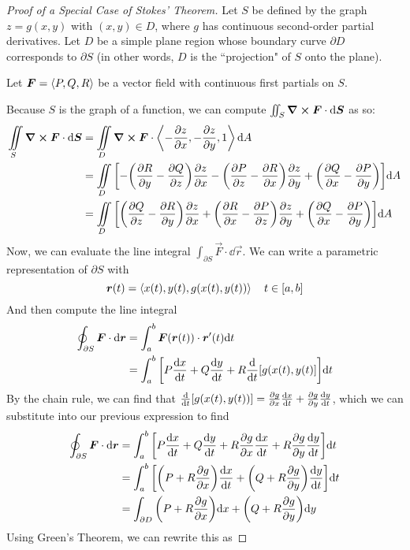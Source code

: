 \begin{proof}[Proof of a Special Case of Stokes' Theorem]
    Let $S$ be defined by the graph $z = g(x,y)$ with $(x,y)\in D$, where $g$ has continuous second-order partial derivatives. Let $D$ be a simple plane region whose boundary curve $\partial D$ corresponds to $\partial S$ (in other words, $D$ is the ``projection" of $S$ onto the plane). \par
    Let $\boldsymbol{F} = \left\langle P, Q, R\right\rangle$ be a vector field with continuous first partials on $S$. \par
    Because $S$ is the graph of a function, we can compute $\iint_S \curl \boldsymbol{F} \cdot \dd \boldsymbol{S}$ as so:
    \begin{align*}
        \iint\limits_S \curl\vec F \cdot \dd \vec S 
        &=\iint\limits_D \curl \vec F \cdot \<-\pdv{z}{x}, -\pdv{z}{y}, 1 \>\dd A \\
        &= \iint\limits_D \bqty{-\pqty{\pdv{R}{y}-\pdv{Q}{z}}\pdv{z}{x}-\pqty{\pdv{P}{z}-\pdv{R}{x}}\pdv{z}{y}+\pqty{\pdv{Q}{x}-\pdv{P}{y}}}\dd A \\
        &= \iint\limits_D \bqty{\pqty{\pdv{Q}{z}-\pdv{R}{y}}\pdv{z}{x}+\pqty{\pdv{R}{x}-\pdv{P}{z}}\pdv{z}{y}+\pqty{\pdv{Q}{x}-\pdv{P}{y}}}\dd A
    \end{align*}
    Now, we can evaluate the line integral $\int_{\partial S}\vec F \cdot \dd \vec r$. We can write a parametric representation of $\partial S$ with
    \[ \boldsymbol{r}(t) = \left\langle x(t), y(t), g(x(t), y(t))\right\rangle \quad t\in[a,b]\]
    And then compute the line integral
    \begin{align*}
        \oint_{\partial S} \vec F \cdot \dd \vec r &= \int_a^b \vec F(\vec r(t)) \cdot \vec r'(t)\dd t \\
        &= \int_a^b \bqty{P\dv{x}{t} + Q\dv{y}{t} + R\dv{t}[g(x(t),y(t)]}\dd t
    \end{align*}
    By the chain rule, we can find that $\dv{t}[g(x(t),y(t))] = \pdv{g}{x}\dv{x}{t} + \pdv{g}{y}\dv{y}{t}$,
    which we can substitute into our previous expression to find
    \begin{align*}
        \oint_{\partial S} \vec F \cdot \dd \vec r &= \int_a^b \bqty{P\dv{x}{t} + Q\dv{y}{t} + R\pdv{g}{x}\dv{x}{t} + R\pdv{g}{y}\dv{y}{t}}\dd t \\
        &= \int_a^b \bqty{\pqty{P + R\pdv{g}{x}}\dv{x}{t} + \pqty{Q+R\pdv{g}{y}}\dv{y}{t}}\dd t \\
        &= \int_{\partial D} \pqty{P + R\pdv{g}{x}}\dd x + \pqty{Q + R\pdv{g}{y}}\dd y
    \end{align*}
    Using Green's Theorem, we can rewrite this as

\end{proof}
